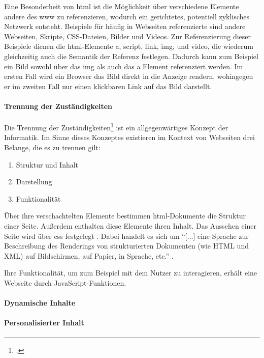            Eine Besonderheit von \gls{html} ist die Möglichkeit
            über verschiedene Elemente andere {\resources} des \gls{www} zu referenzieren,
            wodurch ein gerichtetes, potentiell zyklisches Netzwerk entsteht.
            Beispiele für häufig in Webseiten referenzierte {\resources}
            sind andere Webseiten, Skripte, CSS-Dateien, Bilder und Videos.
            Zur Referenzierung dieser Beispiele dienen die \gls{html}-Elemente
            a, script, link, img, und video,
            die wiederum gleichzeitig auch die Semantik der Referenz festlegen.
            Dadurch kann zum Beispiel ein Bild sowohl über das img
            als auch das a Element referenziert werden.
            Im ersten Fall wird ein Browser das Bild direkt in die Anzeige rendern,
            wohingegen er im zweiten Fall nur einen klickbaren Link auf das Bild darstellt.

            \paragraph*{Trennung der Zuständigkeiten}
            Die Trennung der Zuständigkeiten\footcite[vgl.][]{huersch:SeparationOfConcerns}
            ist ein allgegenwärtiges Konzept der Informatik.
            Im Sinne dieses Konzeptes existieren im Kontext von Webseiten
            drei Belange, die es zu trennen gilt:

            \begin{enumerate}
                \item Struktur und Inhalt
                \item Darstellung
                \item Funktionalität
            \end{enumerate}

            Über ihre verschachtelten Elemente bestimmen \gls{html}-Dokumente die Struktur einer Seite.
            Außerdem enthalten diese Elemente ihren Inhalt.
            Das Aussehen einer Seite wird über \gls{css} festgelegt \cite{w3c:css}.
            Dabei handelt es sich um "`[...] eine Sprache zur Beschreibung des Renderings
            von strukturierten Dokumenten (wie HTML und XML) auf Bildschirmen, auf Papier,
            in Sprache, etc."' \cite{w3c:css}.


            Ihre Funktionalität, um zum Beispiel mit dem Nutzer zu interagieren,
            erhält eine Webseite durch JavaScript-Funktionen.


            \paragraph*{Dynamische Inhalte}
            \paragraph*{Personalisierter Inhalt}